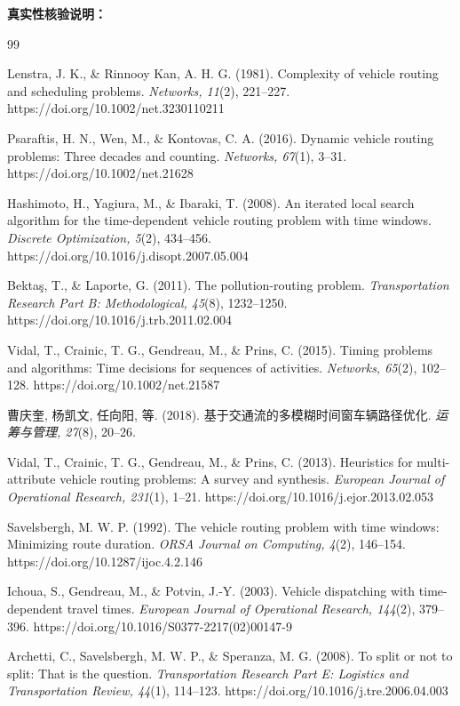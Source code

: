\documentclass[12pt,a4paper]{article}
\begin{document}
{}
\noindent\textbf{真实性核验说明：}
\begin{thebibliography}{99}

 Lenstra, J. K., \& Rinnooy Kan, A. H. G. (1981). Complexity of vehicle routing and scheduling problems. \textit{Networks, 11}(2), 221--227. https://doi.org/10.1002/net.3230110211

 Psaraftis, H. N., Wen, M., \& Kontovas, C. A. (2016). Dynamic vehicle routing problems: Three decades and counting. \textit{Networks, 67}(1), 3--31. https://doi.org/10.1002/net.21628

 Hashimoto, H., Yagiura, M., \& Ibaraki, T. (2008). An iterated local search algorithm for the time-dependent vehicle routing problem with time windows. \textit{Discrete Optimization, 5}(2), 434--456. https://doi.org/10.1016/j.disopt.2007.05.004

 Bekta\c{s}, T., \& Laporte, G. (2011). The pollution-routing problem. \textit{Transportation Research Part B: Methodological, 45}(8), 1232--1250. https://doi.org/10.1016/j.trb.2011.02.004

 Vidal, T., Crainic, T. G., Gendreau, M., \& Prins, C. (2015). Timing problems and algorithms: Time decisions for sequences of activities. \textit{Networks, 65}(2), 102--128. https://doi.org/10.1002/net.21587

 曹庆奎, 杨凯文, 任向阳, 等. (2018). 基于交通流的多模糊时间窗车辆路径优化. \textit{运筹与管理, 27}(8), 20--26. 

 Vidal, T., Crainic, T. G., Gendreau, M., \& Prins, C. (2013). Heuristics for multi-attribute vehicle routing problems: A survey and synthesis. \textit{European Journal of Operational Research, 231}(1), 1--21. https://doi.org/10.1016/j.ejor.2013.02.053

 Savelsbergh, M. W. P. (1992). The vehicle routing problem with time windows: Minimizing route duration. \textit{ORSA Journal on Computing, 4}(2), 146--154. https://doi.org/10.1287/ijoc.4.2.146

 Ichoua, S., Gendreau, M., \& Potvin, J.-Y. (2003). Vehicle dispatching with time-dependent travel times. \textit{European Journal of Operational Research, 144}(2), 379--396. https://doi.org/10.1016/S0377-2217(02)00147-9

 Archetti, C., Savelsbergh, M. W. P., \& Speranza, M. G. (2008). To split or not to split: That is the question. \textit{Transportation Research Part E: Logistics and Transportation Review, 44}(1), 114--123. https://doi.org/10.1016/j.tre.2006.04.003


\end{thebibliography}
\end{document}
